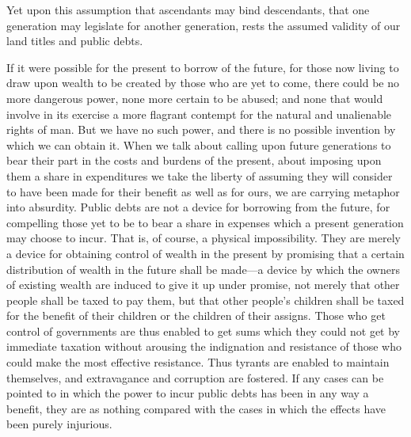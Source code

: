 \documentclass{book}
\begin{document}
Yet upon this assumption that ascendants may bind descendants, that one generation may legislate for another generation, rests the assumed validity of our land titles and public debts.

If it were possible for the present to borrow of the future, for those now living to draw upon wealth to be created by those who are yet to come, there could be no more dangerous power, none more certain to be abused; and none that would involve in its exercise a more flagrant contempt for the natural and unalienable rights of man. But we have no such power, and there is no possible invention by which we can obtain it. When we talk about calling upon future generations to bear their part in the costs and burdens of the present, about imposing upon them a share in expenditures we take the liberty of assuming they will consider to have been made for their benefit as well as for ours, we are carrying metaphor into absurdity. Public debts are not a device for borrowing from the future, for compelling those yet to be to bear a share in expenses which a present generation may choose to incur. That is, of course, a physical impossibility. They are merely a device for obtaining control of wealth in the present by promising that a certain distribution of wealth in the future shall be made—a device by which the owners of existing wealth are induced to give it up under promise, not merely that other people shall be taxed to pay them, but that other people’s children shall be taxed for the benefit of their children or the children of their assigns. Those who get control of governments are thus enabled to get sums which they could not get by immediate taxation without arousing the indignation and resistance of those who could make the most effective resistance. Thus tyrants are enabled to maintain themselves, and extravagance and corruption are fostered. If any cases can be pointed to in which the power to incur public debts has been in any way a benefit, they are as nothing compared with the cases in which the effects have been purely injurious.
\end{document}
